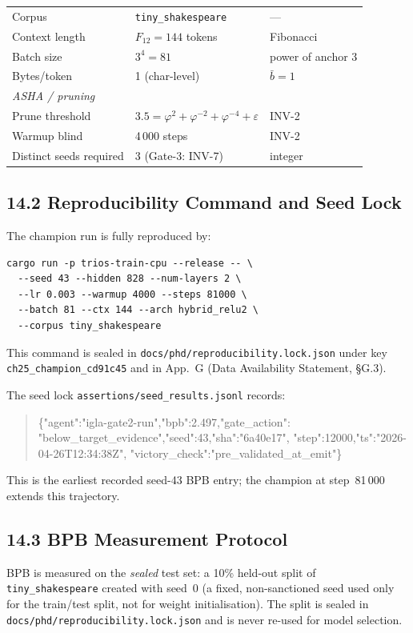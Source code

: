 \begin{table}[h]
\begin{tabular}{lll}
Corpus & \texttt{tiny\_shakespeare} & —\\
Context length & $F_{12} = 144$ tokens & Fibonacci\\
Batch size & $3^4 = 81$ & power of anchor 3\\
Bytes/token & 1 (char-level) & $\bar{b}=1$\\
\midrule
\multicolumn{3}{l}{\textit{ASHA / pruning}}\\
Prune threshold & $3.5 = \varphi^2+\varphi^{-2}+\varphi^{-4}+\varepsilon$ & INV-2\\
Warmup blind & 4\,000 steps & INV-2\\
Distinct seeds required & 3 (Gate-3: INV-7) & integer\\
\bottomrule
\end{tabular}
\end{table}

\subsection{14.2 Reproducibility Command and Seed Lock}
\label{subsec:ch25-reproducibility}

The champion run is fully reproduced by:
\begin{verbatim}
cargo run -p trios-train-cpu --release -- \
  --seed 43 --hidden 828 --num-layers 2 \
  --lr 0.003 --warmup 4000 --steps 81000 \
  --batch 81 --ctx 144 --arch hybrid_relu2 \
  --corpus tiny_shakespeare
\end{verbatim}
This command is sealed in
\texttt{docs/phd/reproducibility.lock.json} under key
\texttt{ch25\_champion\_cd91c45} and in App.~G
(Data Availability Statement, §G.3).

The seed lock \texttt{assertions/seed\_results.jsonl} records:
\begin{quote}\footnotesize\ttfamily
\{"agent":"igla-gate2-run","bpb":2.497,"gate\_action":
"below\_target\_evidence","seed":43,"sha":"6a40e17",
"step":12000,"ts":"2026-04-26T12:34:38Z",
"victory\_check":"pre\_validated\_at\_emit"\}
\end{quote}
This is the earliest recorded seed-43 BPB entry; the champion
at step~81\,000 extends this trajectory.

\subsection{14.3 BPB Measurement Protocol}
\label{subsec:ch25-measurement-protocol}

BPB is measured on the \emph{sealed} test set:
a 10\% held-out split of \texttt{tiny\_shakespeare} created
with seed~0 (a fixed, non-sanctioned seed used only for the
train/test split, not for weight initialisation).  The split
is sealed in \texttt{docs/phd/reproducibility.lock.json} and
is never re-used for model selection.

